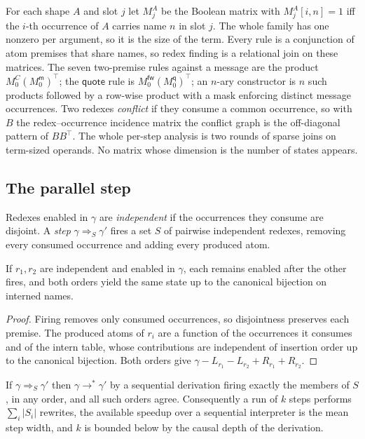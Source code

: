 \documentclass[acmsmall,screen,review,anonymous]{acmart}
\newcommand{\wred}{\longrightarrow^{*}}
\newcommand{\mm}{\mathsf{m}}
\newcommand{\fw}{\mathsf{fw}}
\newcommand{\qq}{\mathsf{q}}
\begin{document}
For each shape $A$ and slot $j$ let $M^{A}_{j}$ be the Boolean matrix with
$M^{A}_{j}[i,n] = 1$ iff the $i$-th occurrence of $A$ carries name $n$ in slot
$j$. The whole family has one nonzero per argument, so it is the size of the
term. Every rule is a conjunction of atom premises that share names, so redex
finding is a relational join on these matrices. The seven two-premise rules
against a message are the product $M^{C}_{0} (M^{\mm}_{0})^{\top}$; the
$\mathsf{quote}$ rule is $M^{\fw}_{0} (M^{\qq}_{0})^{\top}$; an $n$-ary
constructor is $n$ such products followed by a row-wise product with a mask
enforcing distinct message occurrences. Two redexes \emph{conflict} if they
consume a common occurrence, so with $B$ the redex--occurrence incidence
matrix the conflict graph is the off-diagonal pattern of $BB^{\top}$. The whole
per-step analysis is two rounds of sparse joins on term-sized operands. No
matrix whose dimension is the number of states appears.

\subsection{The parallel step}
\label{sec:step}

\begin{definition}[Step]
Redexes enabled in $\gamma$ are \emph{independent} if the occurrences they
consume are disjoint. A \emph{step} $\gamma \Rightarrow_{S} \gamma'$ fires a set
$S$ of pairwise independent redexes, removing every consumed occurrence and
adding every produced atom.
\end{definition}

\begin{lemma}[Diamond]
\label{lem:diamond}
If $r_{1},r_{2}$ are independent and enabled in $\gamma$, each remains enabled
after the other fires, and both orders yield the same state up to the
canonical bijection on interned names.
\end{lemma}

\begin{proof}
Firing removes only consumed occurrences, so disjointness preserves each
premise. The produced atoms of $r_{i}$ are a function of the occurrences it
consumes and of the intern table, whose contributions are independent of
insertion order up to the canonical bijection. Both orders give
$\gamma - L_{r_{1}} - L_{r_{2}} + R_{r_{1}} + R_{r_{2}}$.
\end{proof}

\begin{theorem}
\label{thm:sound}
If $\gamma \Rightarrow_{S} \gamma'$ then $\gamma \wred \gamma'$ by a sequential
derivation firing exactly the members of $S$, in any order, and all such
orders agree. Consequently a run of $k$ steps performs $\sum_{i} |S_{i}|$
rewrites, the available speedup over a sequential interpreter is the mean
step width, and $k$ is bounded below by the causal depth of the derivation.
\end{theorem}
\end{document}
